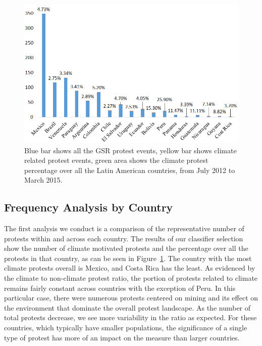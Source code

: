 \begin{figure}[htb]
\centerline
{\includegraphics[width=.8\textwidth]{figures/month-country-protest3}}
\caption{Blue bar shows all the GSR protest events, yellow bar shows climate related protest events, green area shows the climate protest percentage over all the Latin American countries, from July 2012 to March 2015.}
\label{month_percentage}
\end{figure}

\subsection{Frequency Analysis by Country}
The first analysis we conduct is a comparison of the representative number of protests within and across each country.
The results of our classifier selection show the number of climate motivated protests and the percentage over all the protests in that country, as can be seen in Figure~\ref{month_percentage}.
The country with the most climate protests overall is Mexico, and Costa Rica has the least.
As evidenced by the climate to non-climate protest ratio, the portion of protests related to climate remains fairly constant across countries with the exception of Peru.
In this particular case, there were numerous protests centered on mining and its effect on the environment that dominate the overall protest landscape.
As the number of total protests decrease, we see more variability in the ratio as expected.
For these countries, which typically have smaller populations, the significance of a single type of protest has more of an impact on the measure than larger countries.



